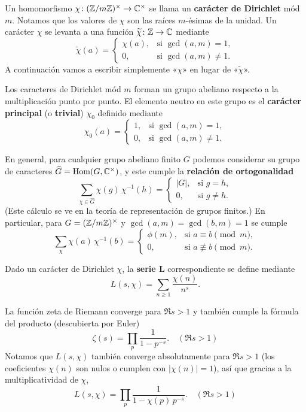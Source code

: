 Un homomorfismo $\chi\colon (\mathbb{Z}/m\mathbb{Z})^\times \to \mathbb{C}^\times$ se llama un
\textbf{carácter de Dirichlet} mód $m$. Notamos que los valores de $\chi$
son las raíces $m$-ésimas de la unidad. Un carácter $\chi$ se levanta a una
función $\widetilde{\chi}\colon \mathbb{Z} \to \mathbb{C}$ mediante
\[ \widetilde{\chi} (a) = \begin{cases}
  \chi (a), & \text{si }\gcd (a,m) = 1, \\
  0, & \text{si }\gcd (a,m) \ne 1.
\end{cases} \]
A continuación vamos a escribir simplemente «$\chi$» en lugar de
«$\widetilde{\chi}$».

Los caracteres de Dirichlet mód $m$ forman un grupo abeliano respecto a
la multiplicación punto por punto. El elemento neutro en este grupo es
el \textbf{carácter principal} (o \textbf{trivial}) $\chi_0$ definido mediante
\[ \chi_0 (a) = \begin{cases}
  1, & \text{si }\gcd (a,m) = 1,\\
  0, & \text{si }\gcd (a,m) \ne 1.
\end{cases} \]

En general, para cualquier grupo abeliano finito $G$ podemos considerar su grupo
de caracteres $\widehat{G} = \operatorname{Hom} (G, \mathbb{C}^\times)$, y este cumple la
\textbf{relación de ortogonalidad}
\[ \sum_{\chi \in \widehat{G}} \chi (g)\,\chi^{-1} (h) = \begin{cases}
    |G|, & \text{si }g = h,\\
    0, & \text{si }g \ne h.
\end{cases} \]
(Este cálculo se ve en la teoría de representación de grupos finitos.)
En particular, para $G = (\mathbb{Z}/m\mathbb{Z})^\times$ y $\gcd (a,m) = \gcd (b,m) = 1$ se
cumple
\begin{equation}
  \label{eqn:relacion-de-ortogonalidad}
  \sum_\chi \chi (a)\,\chi^{-1} (b) = \begin{cases}
    \phi (m), & \text{si }a \equiv b \pmod{m},\\
    0, & \text{si }a \not\equiv b \pmod{m}.
  \end{cases}
\end{equation}

\begin{definicion}
  Dado un carácter de Dirichlet $\chi$, la \textbf{serie L} correspondiente
  se define mediante
  $$L (s,\chi) = \sum_{n\ge 1} \frac{\chi (n)}{n^s}.$$
\end{definicion}

La función zeta de Riemann converge para $\Re s > 1$ y también cumple la
fórmula del producto (descubierta por Euler)
$$\zeta (s) = \prod_p \frac{1}{1 - p^{-s}}. \quad (\Re s > 1)$$
Notamos que $L (s,\chi)$ también converge absolutamente para $\Re s > 1$
(los coeficientes $\chi (n)$ son nulos o cumplen con $|\chi (n)| = 1$),
así que gracias a la multiplicatividad de $\chi$,
$$L (s,\chi) = \prod_p \frac{1}{1 - \chi (p)\,p^{-s}}. \quad (\Re s > 1)$$

